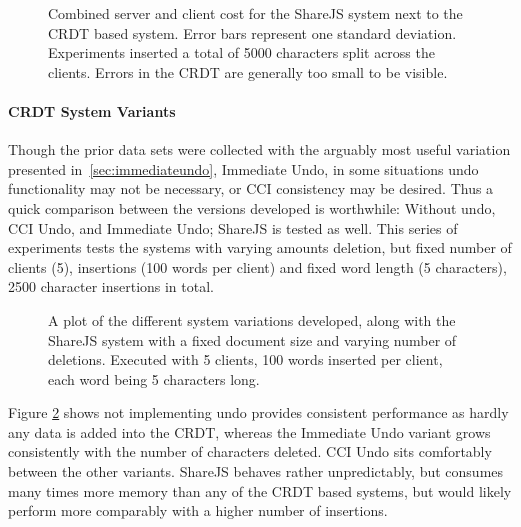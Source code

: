 \documentclass[12pt,a4paper,twoside,openright]{report}
\begin{document}
				\begin{figure}[htb]
					\centering
					
					\caption[Memory Consumption versus Replication] {Combined server and client cost for the ShareJS system next to the CRDT based system. Error bars represent one standard deviation. Experiments inserted a total of 5000 characters split across the clients. Errors in the CRDT are generally too small to be visible.}
					\label{fig:memvsreplication}
				\end{figure}
				
			\paragraph{CRDT System Variants}
				Though the prior data sets were collected with the arguably most useful variation presented in~\cref{sec:immediateundo}, Immediate Undo, in some situations undo functionality may not be necessary, or CCI consistency may be desired. Thus a quick comparison between the versions developed is worthwhile: Without undo, CCI Undo, and Immediate Undo; ShareJS is tested as well. This series of experiments tests the systems with varying amounts deletion, but fixed number of clients (5), insertions (100 words per client) and fixed word length (5 characters), 2500 character insertions in total.
				
				\begin{figure}[htb]
					\centering
					
					\caption[Behavior of System Variants - Memory] {A plot of the different system variations developed, along with the ShareJS system with a fixed document size and varying number of deletions. Executed with 5 clients, 100 words inserted per client, each word being 5 characters long.}
					\label{fig:variantsmemory}
				\end{figure}
				
				Figure \ref{fig:variantsmemory} shows not implementing undo provides consistent performance as hardly any data is added into the CRDT, whereas the Immediate Undo variant grows consistently with the number of characters deleted. CCI Undo sits comfortably between the other variants. ShareJS behaves rather unpredictably, but consumes many times more memory than any of the CRDT based systems, but would likely perform more comparably with a higher number of insertions.
				
\end{document}
